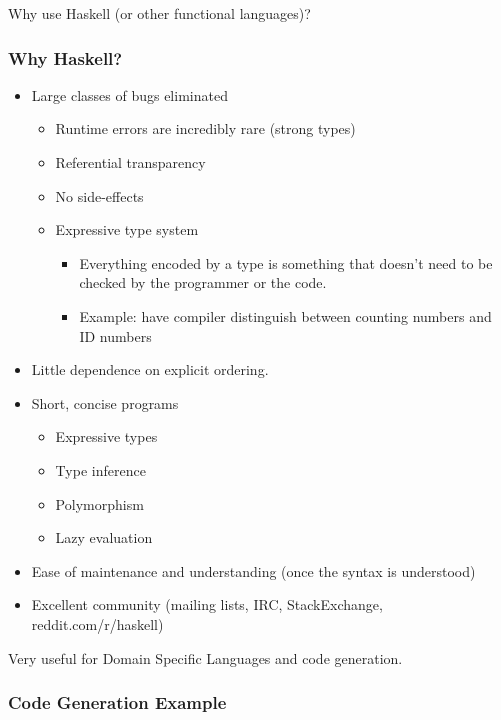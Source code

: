 \begin{frame}
  Why use Haskell (or other functional languages)?
\end{frame}

\begin{frame}
  \frametitle{Why Haskell?}
  \begin{itemize}[<+->]
    \item Large classes of bugs eliminated
      \begin{itemize}[<+->]
        \item Runtime errors are incredibly rare (strong types)
        \item Referential transparency
        \item No side-effects
        \item Expressive type system 
          \begin{itemize}[<+->]
            \item Everything encoded by a type is something that doesn't need to be
                  checked by the programmer or the code.
            \item Example: have compiler distinguish between counting numbers and ID numbers
          \end{itemize}
      \end{itemize}
    \item Little dependence on explicit ordering.
    \item Short, concise programs
      \begin{itemize}[<+->]
        \item Expressive types
        \item Type inference
        \item Polymorphism
        \item Lazy evaluation %
      \end{itemize}
    \item Ease of maintenance and understanding (once the syntax is understood)
    \item Excellent community (mailing lists, IRC, StackExchange, reddit.com/r/haskell)
  \end{itemize}
\end{frame}

\begin{frame}
  Very useful for Domain Specific Languages and code generation.
\end{frame}

\begin{frame}
  \frametitle{Code Generation Example}
  \scriptsize
  
\end{frame}

